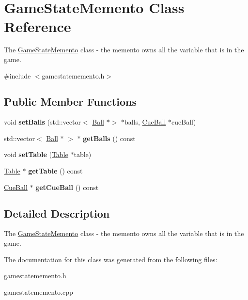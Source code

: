 \hypertarget{class_game_state_memento}{}\section{Game\+State\+Memento Class Reference}
\label{class_game_state_memento}


The \mbox{\hyperlink{class_game_state_memento}{Game\+State\+Memento}} class -\/ the memento owns all the variable that is in the game.  




{\ttfamily \#include $<$gamestatememento.\+h$>$}

\subsection*{Public Member Functions}
\begin{DoxyCompactItemize}
\item 
\mbox{\label{class_game_state_memento_a0e9e9733436c543a7934e23a06a444f7}} 
void {\bfseries set\+Balls} (std\+::vector$<$ \mbox{\hyperlink{class_ball}{Ball}} $\ast$$>$ $\ast$balls, \mbox{\hyperlink{class_cue_ball}{Cue\+Ball}} $\ast$cue\+Ball)
\item 
\mbox{\label{class_game_state_memento_ac6cb0052f023ca92ad95b11b6a6e3368}} 
std\+::vector$<$ \mbox{\hyperlink{class_ball}{Ball}} $\ast$ $>$ $\ast$ {\bfseries get\+Balls} () const
\item 
\mbox{\label{class_game_state_memento_ad08cf61c720dde53e4e482bd0f89ac44}} 
void {\bfseries set\+Table} (\mbox{\hyperlink{class_table}{Table}} $\ast$table)
\item 
\mbox{\label{class_game_state_memento_a32848eb83fbbd09e9b83027b5b3b2224}} 
\mbox{\hyperlink{class_table}{Table}} $\ast$ {\bfseries get\+Table} () const
\item 
\mbox{\label{class_game_state_memento_aef9f3aee04c74a923b9198f54be6f88f}} 
\mbox{\hyperlink{class_cue_ball}{Cue\+Ball}} $\ast$ {\bfseries get\+Cue\+Ball} () const
\end{DoxyCompactItemize}


\subsection{Detailed Description}
The \mbox{\hyperlink{class_game_state_memento}{Game\+State\+Memento}} class -\/ the memento owns all the variable that is in the game. 

The documentation for this class was generated from the following files\+:\begin{DoxyCompactItemize}
\item 
gamestatememento.\+h\item 
gamestatememento.\+cpp\end{DoxyCompactItemize}
